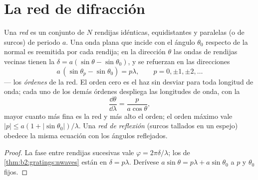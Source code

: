 \section{La red de difracción}

\begin{proposition}\label{prop:b2:gratings:equation}
Una \emph{red} es un conjunto de $N$ rendijas idénticas, equidistantes y paralelas
(o de surcos) de periodo $a$. Una onda plana que incide con el ángulo $\theta_0$
respecto de la normal es reemitida por cada rendija; en la dirección $\theta$ las
ondas de rendijas vecinas tienen la  $\delta = a(\sin\theta
- \sin\theta_0)$, y se refuerzan en las direcciones
\[
a\,(\sin\theta_p - \sin\theta_0) = p\lambda , \qquad p = 0, \pm1, \pm2, \dots
\]
--- los \emph{órdenes} de la red. El orden cero es el haz sin desviar
para toda longitud de onda; cada uno de los demás órdenes despliega las longitudes de onda,
con la \emph{}
\[
\frac{\dd\theta}{\dd\lambda} = \frac{p}{a\cos\theta} ,
\]
mayor cuanto más fina es la red y más alto el orden; el orden máximo vale
$|p| \le a(1 + |\sin\theta_0|)/\lambda$. Una \emph{red de reflexión} (surcos tallados
en un espejo) obedece la misma ecuación con los ángulos reflejados.
\end{proposition}

\begin{proof}
La fase entre rendijas sucesivas vale $\varphi = 2\pi\delta/\lambda$; los  de \cref{thm:b2:gratings:nwaves} están en $\delta = p\lambda$.
Derívese $a\sin\theta = p\lambda + a\sin\theta_0$ a $p$ y $\theta_0$ fijos.
\end{proof}

